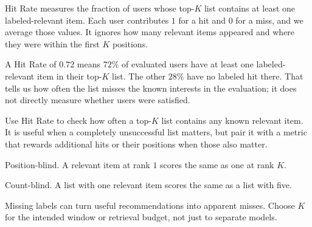 Hit Rate measures the fraction of users whose top-$K$ list contains at least one labeled-relevant item. Each user contributes $1$ for a hit and $0$ for a miss, and we average those values. It ignores how many relevant items appeared and where they were within the first $K$ positions.

\begin{metricformula}
\end{metricformula}

A Hit Rate of $0.72$ means $72\%$ of evaluated users have at least one labeled-relevant item in their top-$K$ list. The other $28\%$ have no labeled hit there. That tells us how often the list misses the known interests in the evaluation; it does not directly measure whether users were satisfied.


Use Hit Rate to check how often a top-$K$ list contains any known relevant item. It is useful when a completely unsuccessful list matters, but pair it with a metric that rewards additional hits or their positions when those also matter.

{
    \item Position-blind. A relevant item at rank $1$ scores the same as one at rank $K$.
    \item Count-blind. A list with one relevant item scores the same as a list with five.
    \item Missing labels can turn useful recommendations into apparent misses. Choose $K$ for the intended window or retrieval budget, not just to separate models.
}

